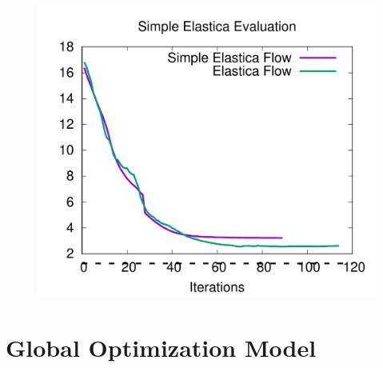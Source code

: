 \begin{figure}[h!]
{\includegraphics[scale=0.28]{figures/chapter5/sqc/plots/fixed-flower-1.pdf}
}\hspace{0.25em}%
\end{figure}

\section{Global Optimization Model}

